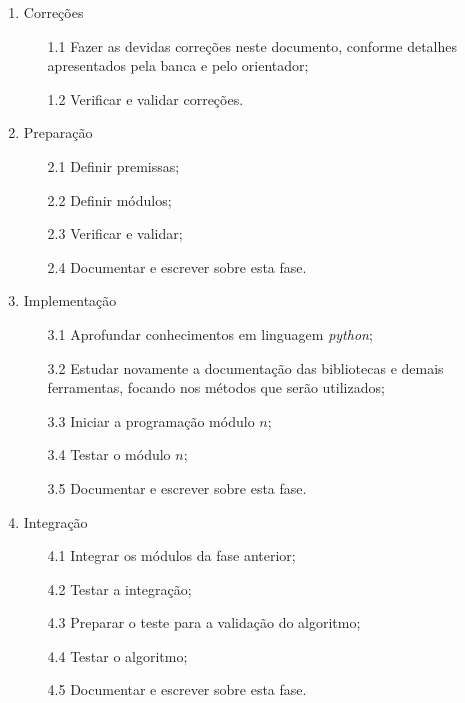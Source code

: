 \begin{enumerate}
    \item Correções
        \begin{enumerate}
            \item[1.1] Fazer as devidas correções neste documento, conforme detalhes apresentados pela banca e pelo orientador;
            \item[1.2] Verificar e validar correções.
        \end{enumerate}

    \item Preparação
        \begin{enumerate}
            \item[2.1] Definir premissas;
            \item[2.2] Definir módulos;
            \item[2.3] Verificar e validar;
            \item[2.4] Documentar e escrever sobre esta fase.
        \end{enumerate}

    \item Implementação
        \begin{enumerate}
            \item[3.1] Aprofundar conhecimentos em linguagem \textit{python};
            \item[3.2] Estudar novamente a documentação das bibliotecas e demais ferramentas, focando nos métodos que serão utilizados;
            \item[3.3] Iniciar a programação módulo $n$;
            \item[3.4] Testar o módulo $n$;
            \item[3.5] Documentar e escrever sobre esta fase.
        \end{enumerate}
        
    \item Integração
        \begin{enumerate}
            \item[4.1] Integrar os módulos da fase anterior;
            \item[4.2] Testar a integração;
            \item[4.3] Preparar o teste para a validação do algoritmo;
            \item[4.4] Testar o algoritmo;
            \item[4.5] Documentar e escrever sobre esta fase.
        \end{enumerate}
        

\end{enumerate}
